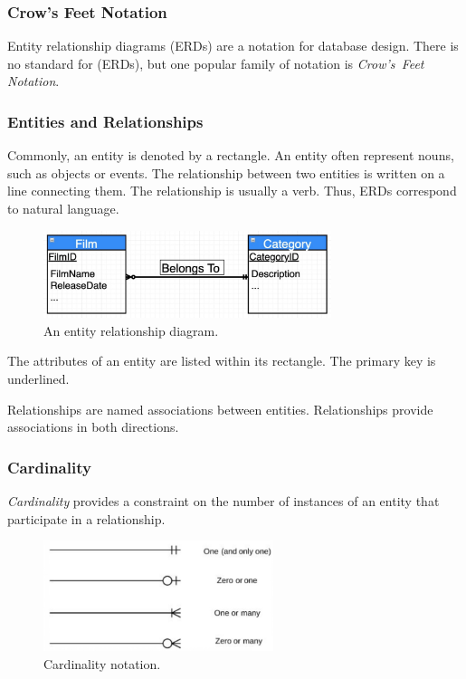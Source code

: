 \subsubsection{Crow's Feet Notation}

Entity relationship diagrams (ERDs) are a notation for database design.
There is no standard for (ERDs), but one popular family of notation is \emph{Crow's~Feet Notation}.

\subsubsection{Entities and Relationships}

Commonly, an entity is denoted by a rectangle.
An entity often represent nouns, such as objects or events.
The relationship between two entities is written on a line connecting them.
The relationship is usually a verb.
Thus, ERDs correspond to natural language.

\begin{figure}[htp]
  \centering
  \includegraphics[width=0.75\textwidth]{unit-1/figures/er-diagram.jpg}
  \caption*{An entity relationship diagram.}
\end{figure}

The attributes of an entity are listed within its rectangle.
The primary key is underlined.

Relationships are named associations between entities.
Relationships provide associations in both directions.

\subsubsection{Cardinality}

\emph{Cardinality} provides a constraint on the number of instances of an entity that participate in a relationship.

\begin{figure}[htp]
  \centering
  \includegraphics[width=0.6\textwidth]{unit-1/figures/cardinality-notation.jpg}
  \caption*{Cardinality notation.}
\end{figure}

